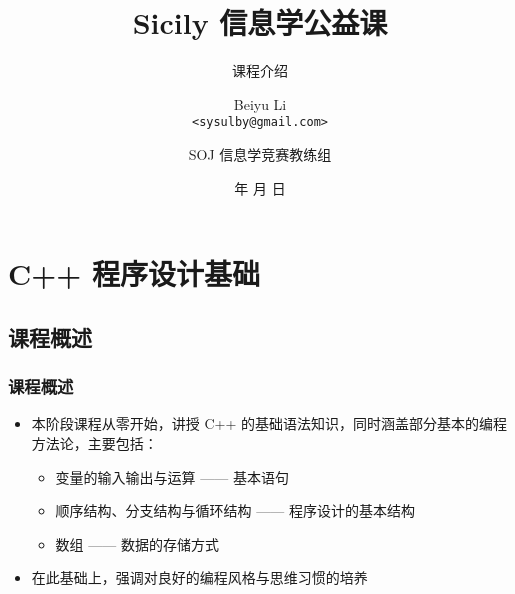 \title[Sicily 信息学公益课]
{Sicily 信息学公益课}

\subtitle{课程介绍}

\author[Beiyu Li]
{Beiyu Li\\
\texttt{<sysulby@gmail.com>}}


\date[\today]
{\number\year 年 \number\month 月 \number\day 日}




\author[sysulby]
{SOJ 信息学竞赛教练组}

\begin{frame}
    \titlepage
\end{frame}
\setcounter{framenumber}{0} %


\setcounter{framenumber}{0} %


\section{C++ 程序设计基础}

\subsection{课程概述}

\begin{frame}[fragile]
    \frametitle{课程概述}

    \begin{itemize}[<+->]
        \item 本阶段课程从零开始，讲授 C++ 的基础语法知识，同时涵盖部分基本的编程方法论，主要包括：

            \begin{itemize}
                \item 变量的输入输出与运算 —— 基本语句
                \item 顺序结构、分支结构与循环结构 —— 程序设计的基本结构
                \item 数组 —— 数据的存储方式
            \end{itemize}

        \item 在此基础上，强调对良好的编程风格与思维习惯的培养
    \end{itemize}
\end{frame}

